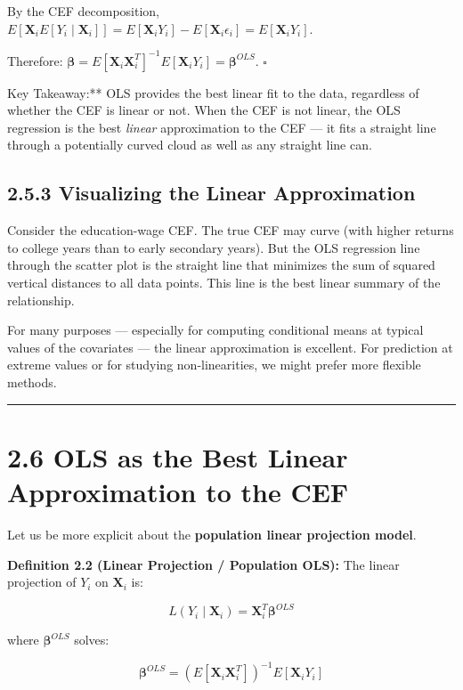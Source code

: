 By the CEF decomposition, $E[\mathbf{X}_i E[Y_i \mid \mathbf{X}_i]] = E[\mathbf{X}_i Y_i] - E[\mathbf{X}_i \epsilon_i] = E[\mathbf{X}_i Y_i]$. 

Therefore: $\boldsymbol{\beta} = E[\mathbf{X}_i \mathbf{X}_i^T]^{-1} E[\mathbf{X}_i Y_i] = \boldsymbol{\beta}^{OLS}$. $\square$

\begin{keybox}{Key Takeaway:** OLS provides the best linear fit to the data, regardless of whether the CEF is linear or not. When the CEF is not linear, the OLS regression is the best \textit{linear} approximation to the CEF --- it fits a straight line through a potentially curved cloud as well as any straight line can.}
\end{keybox}

\subsection{2.5.3 Visualizing the Linear Approximation}

Consider the education-wage CEF. The true CEF may curve (with higher returns to college years than to early secondary years). But the OLS regression line through the scatter plot is the straight line that minimizes the sum of squared vertical distances to all data points. This line is the best linear summary of the relationship.

For many purposes --- especially for computing conditional means at typical values of the covariates --- the linear approximation is excellent. For prediction at extreme values or for studying non-linearities, we might prefer more flexible methods.

\medskip\hrule\medskip

\section{2.6 OLS as the Best Linear Approximation to the CEF}

Let us be more explicit about the \textbf{population linear projection model}. 

\textbf{Definition 2.2 (Linear Projection / Population OLS):} The linear projection of $Y_i$ on $\mathbf{X}_i$ is:

\[
L(Y_i \mid \mathbf{X}_i) = \mathbf{X}_i^T \boldsymbol{\beta}^{OLS}
\]

where $\boldsymbol{\beta}^{OLS}$ solves:

\[
\boldsymbol{\beta}^{OLS} = \left(E[\mathbf{X}_i \mathbf{X}_i^T]\right)^{-1} E[\mathbf{X}_i Y_i]
\]

